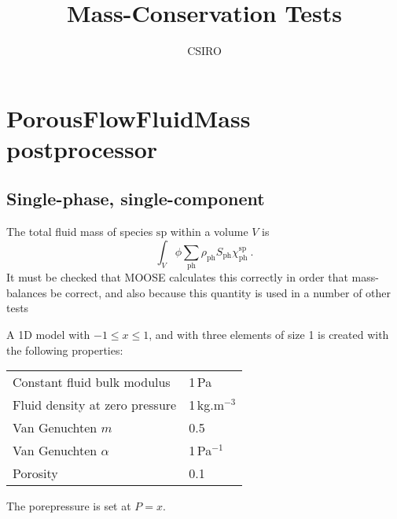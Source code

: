 \documentclass[]{scrreprt}
\def\species{\mathrm{sp}}
\def\phase{\mathrm{ph}}
\def\massfrac{\chi}
\begin{document}
\title{Mass-Conservation Tests}
\author{CSIRO}
\maketitle

\tableofcontents

\chapter{PorousFlowFluidMass postprocessor}

\section{Single-phase, single-component}
\label{1phase1comp.sec}

The total fluid mass of species $\species$ within a volume $V$ is
\begin{equation}
\int_{V} \phi\sum_{\phase}\rho_{\phase} S_{\phase}\massfrac_{\phase}^{\species} \ .
\label{eq:mass}
\end{equation}
It must be checked that MOOSE calculates this correctly in order that
mass-balances be correct, and also because this quantity is used in a
number of other tests

A 1D model with $-1\leq x \leq 1$, and with three elements of size 1 is
created with the following properties:
\begin{center}
\begin{tabular}{|ll|}
\hline
Constant fluid bulk modulus & 1\,Pa \\
Fluid density at zero pressure & 1\,kg.m$^{-3}$ \\
Van Genuchten $m$ & 0.5 \\
Van Genuchten $\alpha$ & 1\,Pa$^{-1}$ \\
Porosity & 0.1 \\
\hline
\end{tabular}
\end{center}
The porepressure is set at $P=x$.
\end{document}
